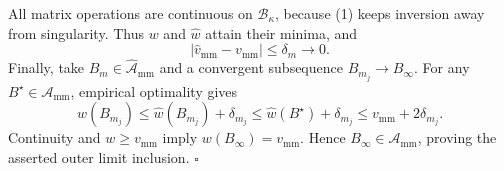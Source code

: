 All matrix operations are continuous on \(\mathcal B_\kappa\), because (1) keeps inversion away from singularity.  Thus \(w\) and \(\widehat w\) attain their minima, and
\[
 \lvert\widehat v_{\mathrm{mm}}-v_{\mathrm{mm}}\rvert\le\delta_m\longrightarrow0.
 \tag{10}
\]
Finally, take \(B_m\in\widehat{\mathcal A}_{\mathrm{mm}}\) and a convergent subsequence \(B_{m_j}\to B_\infty\).  For any \(B^\star\in\mathcal A_{\mathrm{mm}}\), empirical optimality gives
\[
 w(B_{m_j})\le\widehat w(B_{m_j})+\delta_{m_j}
 \le\widehat w(B^\star)+\delta_{m_j}
 \le v_{\mathrm{mm}}+2\delta_{m_j}.
 \tag{11}
\]
Continuity and \(w\ge v_{\mathrm{mm}}\) imply \(w(B_\infty)=v_{\mathrm{mm}}\).  Hence \(B_\infty\in\mathcal A_{\mathrm{mm}}\), proving the asserted outer limit inclusion. \(\square\)